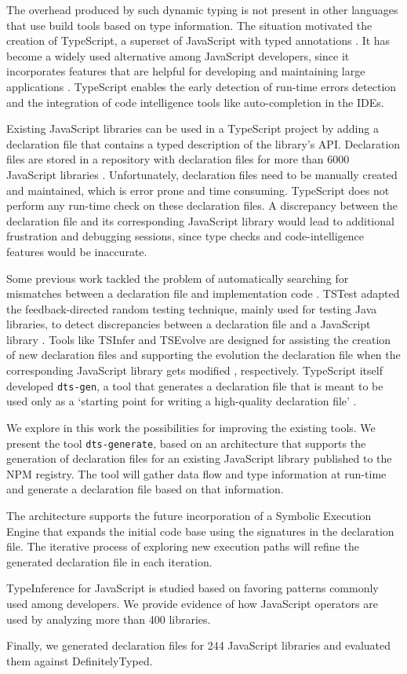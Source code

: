 The overhead produced by such dynamic typing is not present in other languages that use build tools based on type information. The situation motivated the creation of TypeScript, a superset of JavaScript with typed annotations \citep{typescript}. It has become a widely used alternative among JavaScript developers, since it incorporates features that are helpful for developing and maintaining large applications \citep{DBLP:conf/icse/GaoBB17}. TypeScript enables the early detection of run-time errors detection and the integration of code intelligence tools like auto-completion in the IDEs.

Existing JavaScript libraries can be used in a TypeScript project by adding a declaration file that contains a typed description of the library's API. Declaration files are stored in a repository with declaration files for more than 6000 JavaScript libraries \citep{definitely-typed-repository}. Unfortunately, declaration files need to be manually created and maintained, which is error prone and time consuming. TypeScript does not perform any run-time check on these declaration files. A discrepancy between the declaration file and its corresponding JavaScript library would lead to additional frustration and debugging sessions, since type checks and code-intelligence features would be inaccurate.

Some previous work tackled the problem of automatically searching for mismatches between a declaration file and implementation code \citep{DBLP:conf/oopsla/FeldthausM14}. TSTest adapted the feedback-directed random testing technique, mainly used for testing Java libraries, to detect discrepancies between a declaration file and a JavaScript library \citep{DBLP:journals/pacmpl/KristensenM17}. Tools like TSInfer and TSEvolve are designed for assisting the creation of new declaration files and supporting the evolution the declaration file when the corresponding JavaScript library gets modified \citep{DBLP:conf/fase/KristensenM17}, respectively. TypeScript itself developed \texttt{dts-gen}, a tool that generates a declaration file that is meant to be used only as a `starting point for writing a high-quality declaration file' \citep{dts-gen}.

We explore in this work the possibilities for improving the existing tools. We present the tool \texttt{dts-generate}, based on an architecture that supports the generation of declaration files for an existing JavaScript library published to the NPM registry. The tool will gather data flow and type information at run-time and generate a declaration file based on that information.

The architecture supports the future incorporation of a Symbolic Execution Engine that expands the initial code base using the signatures in the declaration file. The iterative process of exploring new execution paths will refine the generated declaration file in each iteration.

TypeInference for JavaScript is studied based on favoring patterns commonly used among developers. We provide evidence of how JavaScript operators are used by analyzing more than 400 libraries.

Finally, we generated declaration files for 244 JavaScript libraries and evaluated them against DefinitelyTyped.
